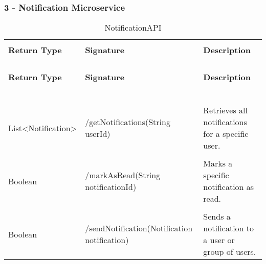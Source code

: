 \subsubsection{3 - Notification Microservice}

\begin{longtable}{p{}p{}p{}}
    \caption{NotificationAPI}
    \vspace{0.5em}\\
    \hline
    \vspace{0.5em}\\
    \textbf{Return Type} & \textbf{Signature} & \textbf{Description} \\
    \vspace{0.5em}\\
    \hline
    \vspace{0.5em}\\
    \endfirsthead
    \vspace{0.5em}\\
    \hline
    \vspace{0.5em}\\
    \textbf{Return Type} & \textbf{Signature} & \textbf{Description} \\
    \vspace{0.5em}\\
    \hline
    \vspace{0.5em}\\
    \endhead
    
    \vspace{0.5em}\\
    \hline
    \vspace{0.5em}\\
    \endfoot
    
    \vspace{0.5em}\\
    \hline
    \vspace{0.5em}\\
    \endlastfoot
    
    List<Notification> &
    /getNotifications(String userId) &
    Retrieves all notifications for a specific user. \\
    \vspace{0.5em}\\
    Boolean &
    /markAsRead(String notificationId) &
    Marks a specific notification as read. \\
    \vspace{0.5em}\\
    Boolean &
    /sendNotification(Notification notification) &
    Sends a notification to a user or group of users. \\

\end{longtable}

